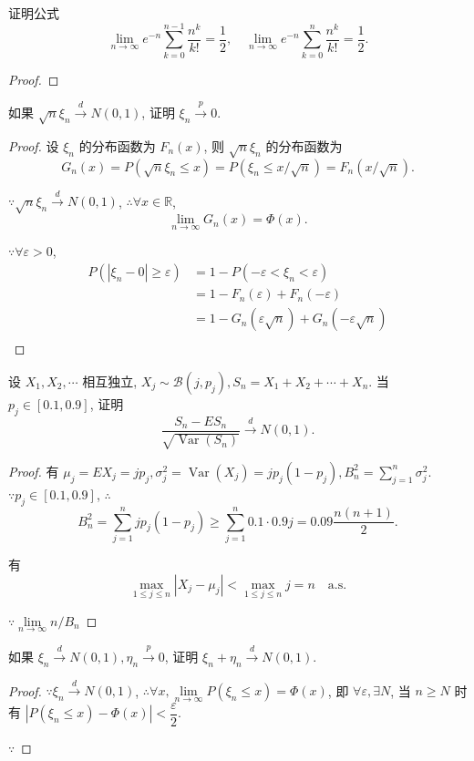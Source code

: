 \documentclass{ctexart}
\begin{document}
\addtocounter{exercise}{3}
\begin{exercise}%
    证明公式
    \[\lim\limits_{n\to\infty}e^{-n}\sum\limits_{k=0}^{n-1}\dfrac{n^k}{k!}=\dfrac{1}{2},\quad\lim\limits_{n\to\infty}e^{-n}\sum\limits_{k=0}^n\dfrac{n^k}{k!}=\dfrac{1}{2}.\]
\end{exercise}
\begin{proof}
    
\end{proof}
\begin{exercise}%
    如果 $\sqrt{n}\xi_n\xrightarrow{d}N(0,1)$, 证明 $\xi_n\xrightarrow{p}0$.
\end{exercise}
\begin{proof}
    设 $\xi_n$ 的分布函数为 $F_n(x)$, 则 $\sqrt{n}\xi_n$ 的分布函数为
    \[G_n(x)=P(\sqrt{n}\xi_n\leq x)=P(\xi_n\leq x/\sqrt{n})=F_n(x/\sqrt{n}).\]
    
    $\because\sqrt{n}\xi_n\xrightarrow{d}N(0,1)$, $\therefore\forall x\in\mathbb{R}$,
    \[\lim\limits_{n\to\infty}G_n(x)=\Phi(x).\]

    $\because\forall\varepsilon>0$,
    \begin{align*}
        P(|\xi_n-0|\geq\varepsilon) & =1-P(-\varepsilon<\xi_n<\varepsilon) \\
        & =1-F_n(\varepsilon)+F_n(-\varepsilon) \\
        & =1-G_n(\varepsilon\sqrt{n})+G_n(-\varepsilon\sqrt{n}) \\
    \end{align*}
\end{proof}
\begin{exercise}%
    设 $X_1,X_2,\cdots$ 相互独立, $X_j\sim\mathcal{B}(j,p_j),S_n=X_1+X_2+\cdots+X_n$. 当 $p_j\in[0.1,0.9]$, 证明
    \[\dfrac{S_n-ES_n}{\sqrt{\operatorname{Var}(S_n)}}\xrightarrow{d}N(0,1).\]
\end{exercise}
\begin{proof}
    有 $\mu_j=EX_j=jp_j,\sigma_j^2=\operatorname{Var}(X_j)=jp_j(1-p_j),B_n^2=\sum\limits_{j=1}^n\sigma_j^2$. $\because p_j\in[0.1,0.9]$, $\therefore$
    \[B_n^2=\sum\limits_{j=1}^njp_j(1-p_j)\geq\sum\limits_{j=1}^n0.1\cdot0.9j=0.09\dfrac{n(n+1)}{2}.\]

    有
    \[\max\limits_{1\leq j\leq n}|X_j-\mu_j|<\max\limits_{1\leq j\leq n}j=n\quad\text{a.s.}\]

    $\because\lim\limits_{n\to\infty}n/B_n$
\end{proof}
\begin{exercise}\label{ex7.25}
    如果 $\xi_n\xrightarrow{d}N(0,1),\eta_n\xrightarrow{p}0$, 证明 $\xi_n+\eta_n\xrightarrow{d}N(0,1)$.
\end{exercise}
\begin{proof}
    $\because\xi_n\xrightarrow{d}N(0,1)$, $\therefore\forall x,\lim\limits_{n\to\infty}P(\xi_n\leq x)=\Phi(x)$, 即 $\forall\varepsilon,\exists N$, 当 $n\geq N$ 时有 $|P(\xi_n\leq x)-\Phi(x)|<\dfrac{\varepsilon}{2}$.

    $\because$
\end{proof}
\end{document}
